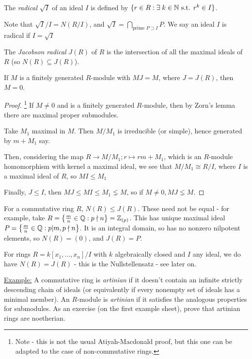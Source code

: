 \documentclass[10pt,a4paper]{article}
\begin{document}
\begin{definition}
  The \emph{radical} $\sqrt{I}$ of an ideal $I$ is defined by $\{r \in R : \exists k \in \N \st r^k \in I\}$.
\end{definition}
Note that $\sqrt{I}/I = N(R/I)$, and $\sqrt{I} = \bigcap\limits_{\text{prime  }P \supset I} P$. We say an ideal $I$ is radical if $I = \sqrt{I}$

\begin{definition}
  The \emph{Jacobson radical} $J(R)$ of $R$ is the intersection of all the maximal ideals of $R$ (so $N(R) \subseteq J(R)$).
\end{definition}

\begin{theorem}
  If $M$ is a finitely generated $R$-module with $MJ = M$, where $J = J(R)$, then $M = 0$.
\end{theorem}
\begin{proof}\footnote{Note - this is not the usual Atiyah-Macdonald proof, but this one can be adapted to the case of non-commutative rings.}
  If $M \neq 0$ and is a finitely generated $R$-module, then by Zorn's lemma there are maximal proper submodules.

  Take $M_1$ maximal in $M$. Then $M/M_1$ is irreducible (or simple), hence generated by $m+M_1$ say.

  Then, considering the map $R \to M/M_1; r\mapsto rm+M_1$, which is an $R$-module homomorphism with kernel a maximal ideal, we see that $M/M_1 \cong R/I$, where $I$ is a maximal ideal of $R$, so $MI \leq M_1$

  Finally, $J \leq I$, then $MJ \leq MI \leq M_1 \lneq M$, so if $M \neq 0, MJ \lneq M$.
\end{proof}


For a commutative ring $R$, $N(R) \leq J(R)$. These need not be equal - for example, take $R = \left\{\frac{m}{n} \in \mathbb{Q}: p \nmid n\right\} = \mathbb{Z}_{(p)}$. This has unique maximal ideal $P = \left\{\frac{m}{n} \in \mathbb{Q} : p|m, p \nmid n \right\}$. It is an integral domain, so has no nonzero nilpotent elements, so $N(R) = (0)$, and $J(R) = P$.

For rings $R = k[x_1, \ldots, x_n]/I$ with $k$ algebraically closed and $I$ any ideal, we do have $N(R) = J(R)$ - this is the Nullstellensatz - see later on.

\underline{Example:} A commutative ring is \emph{artinian} if it doesn't contain an infinite strictly descending chain of ideals (or equivalently if every nonempty set of ideals has a minimal member). An $R$-module is \emph{artinian} if it satisfies the analogous properties for submodules. As an exercise (on the first example sheet), prove that artinian rings are noetherian.
\end{document}
